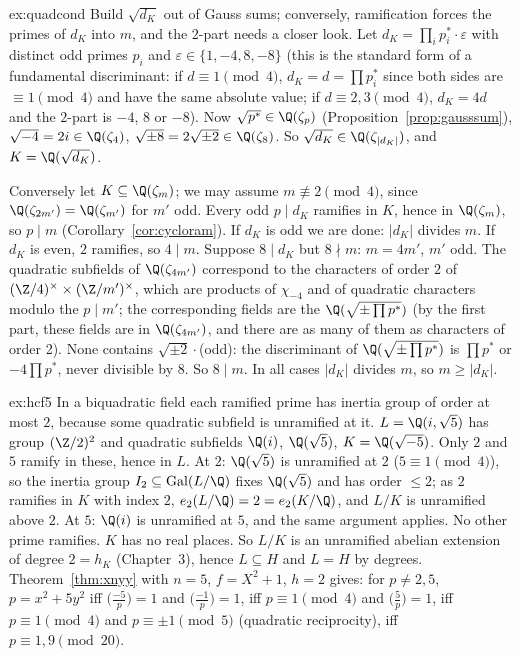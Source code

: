 \begin{solution}{ex:quadcond}
\idea Build $\sqrt{d_K}$ out of Gauss sums; conversely, ramification forces the primes of $d_K$ into $m$, and the $2$-part needs a closer look.
\writeup Let $d_K=\prod_ip_i^*\cdot\varepsilon$ with distinct odd primes $p_i$ and $\varepsilon\in\{1,-4,8,-8\}$ (this is the standard form of a fundamental
discriminant: if $d\equiv1\pmod4$, $d_K=d=\prod p_i^*$ since both sides are $\equiv1\pmod4$ and have the same absolute value; if $d\equiv2,3\pmod4$, $d_K=4d$ and
the $2$-part is $-4$, $8$ or $-8$). Now $\sqrt{p^*}\in\Q(\zeta_p)$ (Proposition~\ref{prop:gausssum}), $\sqrt{-4}=2i\in\Q(\zeta_4)$, $\sqrt{\pm8}=2\sqrt{\pm2}\in\Q(\zeta_8)$.
So $\sqrt{d_K}\in\Q(\zeta_{|d_K|})$, and $K=\Q(\sqrt{d_K})$.

Conversely let $K\subseteq\Q(\zeta_m)$; we may assume $m\not\equiv2\pmod4$, since $\Q(\zeta_{2m'})=\Q(\zeta_{m'})$ for $m'$ odd. Every odd $p\mid d_K$ ramifies in $K$,
hence in $\Q(\zeta_m)$, so $p\mid m$ (Corollary~\ref{cor:cycloram}). If $d_K$ is odd we are done: $|d_K|$ divides $m$. If $d_K$ is even, $2$ ramifies, so $4\mid m$.
Suppose $8\mid d_K$ but $8\nmid m$: $m=4m'$, $m'$ odd. The quadratic subfields of $\Q(\zeta_{4m'})$ correspond to the characters of order $2$ of
$(\Z/4)^\times\times(\Z/m')^\times$, which are products of $\chi_{-4}$ and of quadratic characters modulo the $p\mid m'$; the corresponding fields are the
$\Q(\sqrt{\pm\prod p^*})$ (by the first part, these fields are in $\Q(\zeta_{4m'})$, and there are as many of them as characters of order 2). None contains $\sqrt{\pm2}\cdot$(odd):
the discriminant of $\Q(\sqrt{\pm\prod p^*})$ is $\prod p^*$ or $-4\prod p^*$, never divisible by $8$. So $8\mid m$. In all cases $|d_K|$ divides $m$, so $m\ge|d_K|$.
\end{solution}

\begin{solution}{ex:hcf5}
\idea In a biquadratic field each ramified prime has inertia group of order at most $2$, because some quadratic subfield is unramified at it.
\writeup $L=\Q(i,\sqrt5)$ has group $(\Z/2)^2$ and quadratic subfields $\Q(i)$, $\Q(\sqrt5)$, $K=\Q(\sqrt{-5})$. Only $2$ and $5$ ramify in these, hence in $L$. At $2$:
$\Q(\sqrt5)$ is unramified at $2$ ($5\equiv1\pmod4$), so the inertia group $I_2\subseteq\operatorname{Gal}(L/\Q)$ fixes $\Q(\sqrt5)$ and has order $\le2$; as $2$
ramifies in $K$ with index $2$, $e_2(L/\Q)=2=e_2(K/\Q)$, and $L/K$ is unramified above $2$. At $5$: $\Q(i)$ is unramified at $5$, and the same argument applies.
No other prime ramifies. $K$ has no real places. So $L/K$ is an unramified abelian extension of degree $2=h_K$ (Chapter~3), hence $L\subseteq H$ and $L=H$
by degrees. Theorem~\ref{thm:xnyy} with $n=5$, $f=X^2+1$, $h=2$ gives: for $p\ne2,5$, $p=x^2+5y^2$ iff $\bigl(\frac{-5}p\bigr)=1$ and $\bigl(\frac{-1}p\bigr)=1$, iff
$p\equiv1\pmod4$ and $\bigl(\frac5p\bigr)=1$, iff $p\equiv1\pmod4$ and $p\equiv\pm1\pmod5$ (quadratic reciprocity), iff $p\equiv1,9\pmod{20}$.
\end{solution}

